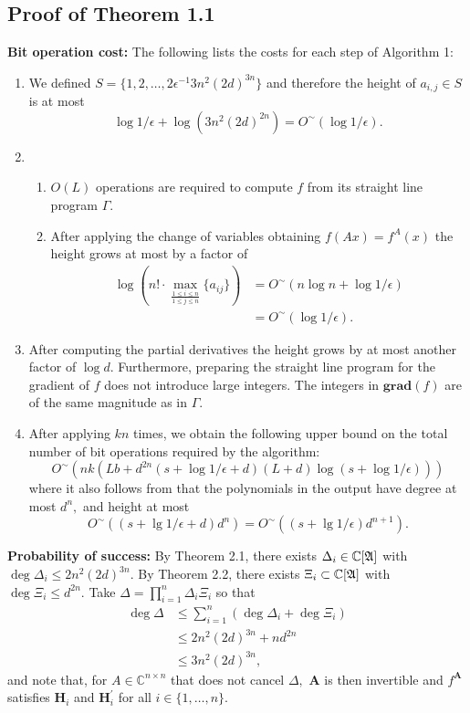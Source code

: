 \documentclass[sigconf]{acmart}
\def\mA{{\bm A}}
\def\C{\mathbb{C}}
\def\grad{\textbf{grad}}
\def\A{\frak{A}}
\begin{document}
\subsection{Proof of Theorem 1.1}
%
\textbf{Bit operation cost:} The following lists the costs for each step of Algorithm 1:
%
\begin{enumerate}
    \item We defined $S = \{1,2,\hdots,2\epsilon^{-1}3n^2(2d)^{3n}\}$ and therefore the height of $a_{i,j} \in S$ is at most 
    \[
    \log 1/{\epsilon} + \log(3n^2(2d)^{2n}) = O^{\sim}(\log 1/{\epsilon}).
    \]
    \item 
    \begin{enumerate}[label=\roman*.]
        \item $O(L)$ operations are required to compute $f$ from its straight line program $\Gamma.$
        \item After applying the change of variables obtaining $f(A x)=f^A(x)$ the height grows at most by a factor of
        \begin{align*}
        \log(n!\cdot \max_{\frac{1\leq i\leq n}{1\leq j\leq n}}\{a_{ij}\}) &= 
        O^{\sim}(n\log n + \log 1/{\epsilon})\\
        &= O^{\sim}(\log 1/{\epsilon}).
        \end{align*}
    \end{enumerate}
    \item After computing the partial derivatives the height grows by at most another factor of $\log d$. Furthermore, preparing the straight line program for the gradient of $f$ does not introduce large integers. The integers in $\grad (f)$ are of the same magnitude as in $\Gamma$.
    \item 
    After applying \cite[Algorithm 2]{SH} $kn$ times, we obtain the
    following upper bound on the total number of bit operations required by the algorithm:
  \[
  O^{\sim}(nk(Lb+d^{2n}(s + \log 1/\epsilon+d)(L+d)\log(s + \log 1/\epsilon)))
  \]
    where it also follows from \cite[Algorithm 2]{SH} that the polynomials in the output have degree at most $d^n,$ and height at most
  \[
  O^{\sim}((s+\lg 1/\epsilon + d)d^n)
  =O^{\sim}((s+\lg 1/\epsilon)d^{n+1}).
  \]
\end{enumerate}
%
\par \noindent 
\textbf{Probability of success:} By Theorem 2.1, there exists $\Delta_i \in \C[\A]$ with $\deg \Delta_i \leq 2n^2(2d)^{3n}.$ By Theorem 2.2, there exists $\Xi_i \subset \C[\A]$ with $\deg \Xi_i \leq d^{2n}.$ Take $\Delta =  \prod_{i=1}^n\Delta_i  \Xi_i $ so that 
%
\begin{align*}
    \deg \Delta &\leq \sum_{i=1}^n (\deg \Delta_i + \deg \Xi_i)\\
    &\leq 2n^2(2d)^{3n} + nd^{2n}\\
    &\leq 3n^2(2d)^{3n}, 
\end{align*}
%
and note that, for $A \in \C^{n \times n}$ that does not cancel $\Delta,$  $\mA$ is then invertible and $f^\mA$ satisfies $\textbf{H}_i$ and $\textbf{H}_i^{'}$ for all $i \in \{1,\hdots,n\}.$
  
\end{document}
